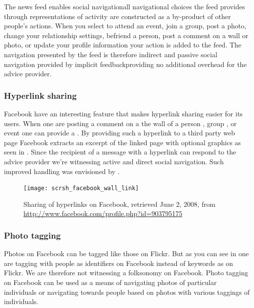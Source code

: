The news feed enables social navigation\dash{}all
navigational choices the feed provides
through representations of activity are constructed as a by-product of
other people's actions. When you select to attend an event, join a group,
post a photo, change your relationship settings, befriend a person, post a
comment on a wall or photo, or update your profile information your action
is added to the feed. The navigation presented by the feed
is therefore indirect and passive social navigation provided by implicit
feedback\dash{}providing no additional overhead for the advice provider.

\subsubsection{Hyperlink sharing}

Facebook have an interesting feature that makes hyperlink sharing easier for
its users. When one are posting a comment on a the wall of a person
,
group
,
or event
one can provide a . By providing such a hyperlink to a
third party web page Facebook extracts an excerpt of the linked page with
optional graphics as seen in . Since the
recipient of a message with a hyperlink can respond to the advice provider
we're witnessing active and direct social navigation. Such
improved  handling was envisioned by
\citet[]{dieberger97}.

\begin{figure}
  \texttt{[image: scrsh\_facebook\_wall\_link]}
  \caption[Facebook Hyperlink Sharing]{%
     Sharing of hyperlinks on Facebook,
     retrieved June 2, 2008, from
     \url{http://www.facebook.com/profile.php?id=903795175}}
  \label{figure:scrsh.facebook.wall.link}
\end{figure}

\subsubsection{Photo tagging}

Photos on Facebook can be tagged  like those on Flickr.
But as you can see in  one are
tagging with people as identifiers on Facebook instead of keywords as on
Flickr. We are
therefore not witnessing a folksonomy on Facebook. Photo tagging on Facebook
can be used as a means of navigating photos of particular individuals or
navigating towards people based on photos with various taggings of
individuals.

